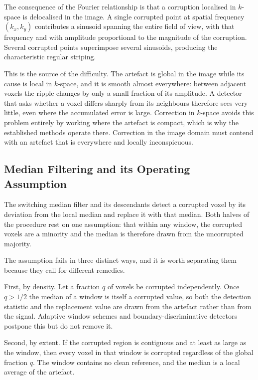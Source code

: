 \documentclass[12pt]{article}
\theoremstyle{definition}
\theoremstyle{plain}
\begin{document}
The consequence of the Fourier relationship is that a corruption localised in
$k$-space is delocalised in the image. A single corrupted point at spatial frequency
$(k_x, k_y)$ contributes a sinusoid spanning the entire field of view, with that
frequency and with amplitude proportional to the magnitude of the corruption.
Several corrupted points superimpose several sinusoids, producing the characteristic
regular striping.

This is the source of the difficulty. The artefact is global in the image while its
cause is local in $k$-space, and it is smooth almost everywhere: between adjacent
voxels the ripple changes by only a small fraction of its amplitude. A detector that
asks whether a voxel differs sharply from its neighbours therefore sees very little,
even where the accumulated error is large. Correction in $k$-space avoids this
problem entirely by working where the artefact is compact, which is why the
established methods operate there. Correction in the image domain must contend with
an artefact that is everywhere and locally inconspicuous.

\subsection{Median Filtering and its Operating Assumption}

The switching median filter and its descendants
\cite{sun1994,hwang1995,wang1999,chen1999tristate,ng2006bdnd} detect a corrupted
voxel by its deviation from the local median and replace it with that median. Both halves of the
procedure rest on one assumption: that within any window, the corrupted voxels are a
minority and the median is therefore drawn from the uncorrupted majority.

The assumption fails in three distinct ways, and it is worth separating them because
they call for different remedies.

First, by density. Let a fraction $q$ of voxels be corrupted independently. Once
$q > 1/2$ the median of a window is itself a corrupted value, so both the detection
statistic and the replacement value are drawn from the artefact rather than from the
signal. Adaptive window schemes \cite{hwang1995} and boundary-discriminative detectors
\cite{ng2006bdnd} postpone this but do not remove it.

Second, by extent. If the corrupted region is contiguous and at least as large as the
window, then every voxel in that window is corrupted regardless of the global
fraction $q$. The window contains no clean reference, and the median is a local
average of the artefact.
\end{document}
